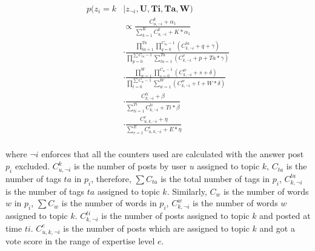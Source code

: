 {{{{{{{\begin{equation}
\begin{split}
p(z_i=k & | z_{\neg i}, \textbf{U}, \textbf{Ti}, \textbf{Ta}, \textbf{W}  ) \\
&\propto   \frac{ C_{u,\neg i}^k + \alpha_1 }{ \sum_{k=1}^K C_{u,\neg i}^k+ K* \alpha_1} \\
&\cdot \frac { \prod_{ta=1}^{Ta} \prod_{q=0}^{C_{ta}-1} ( C_{k,\neg i}^{ta} +q+\gamma) } { \prod_{p=0}^{\sum C_{ta} -1} \sum_{ta=1}^{Ta} (C_{k,\neg i}^v + p + Ta*\gamma  ) } \\
&\cdot \frac { \prod_{w=1}^{W} \prod_{s=0}^{C_w-1} ( C_{k,\neg i}^{w} +s+\delta) } { \prod_{t=0}^{\sum C_{w} -1} \sum_{w=1}^W (C_{k,\neg i}^w + t + W*\delta  ) } \\
&\cdot \frac{ C_{k,\neg i}^{ti} + \beta  }{\sum_{ti=1}^{Ti} C_{k,\neg i}^{ti} + Ti*\beta} \\
&\cdot \frac{ C_{u,k,\neg i}^{e} + \eta }{\sum_{e=1}^{E} C_{u,k,\neg i}^{e} + E * \eta}\\
\end{split}
\label{eq:sample}
\end{equation}

\noindent
where $\neg i$ enforces that all the counters used are calculated with the answer post $p_i$ excluded. $C_{u,\neg i}^k$ is the number of posts by user $u$ assigned to topic $k$, $C_{ta}$ is the number of tags $ta$ in $p_i$, therefore, $\sum C_{ta}$ is the total number of tags in $p_i$, $C_{k,\neg i}^{ta}$ is the number of tags $ta$ assigned to topic $k$. Similarly, $C_{w}$ is the number of words $w$ in $p_i$, $\sum C_{w}$ is the number of words in $p_i$, $C_{k,\neg i}^{w}$ is the number of words $w$ assigned to topic $k$. $C_{k,\neg i}^{ti}$ is the number of posts assigned to topic $k$ and posted at time $ti$. $C_{u,k,\neg i}^{e}$ is the number of posts which are assigned to topic $k$ and got a vote score in the range of expertise level $e$.

}}}}}}}
